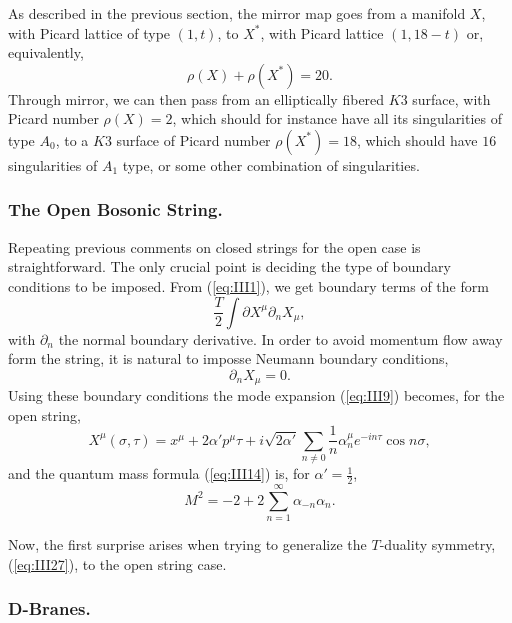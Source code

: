 As described in the previous section, the mirror map goes from a
manifold $X$, with Picard lattice of type $(1,t)$, to $X^*$, with
Picard lattice $(1,18-t)$ or, equivalently,
\begin{equation}
\rho(X) + \rho(X^*)= 20.
\end{equation}
Through mirror, we can then pass from an elliptically fibered $K3$
surface, with Picard number $\rho(X)=2$, which should for
instance have all its singularities of type $A_0$, to a $K3$
surface of Picard number $\rho(X^*)=18$, which should have $16$
singularities of $A_1$ type, or some other combination of
singularities.


\subsubsection{The Open Bosonic String.}

Repeating previous comments on closed strings for the open case is 
straightforward. The only crucial point is deciding the type of boundary 
conditions to be imposed. From (\ref{eq:III1}), we get boundary terms of 
the form
\begin{equation}
\frac {T}{2} \int \partial X^{\mu} \partial_n X_{\mu},
\label{eq:III31}
\end{equation}
with $\partial_n$ the normal boundary derivative. In order to avoid 
momentum flow away form the string, it is natural to imposse 
Neumann boundary conditions,
\begin{equation}
\partial_n X_{\mu} = 0.
\label{eq:III31b}
\end{equation}
Using these boundary conditions the mode expansion (\ref{eq:III9}) becomes, 
for the open string,
\begin{equation}
X^{\mu} (\sigma,\tau)=x^{\mu} + 2 \alpha' p^{\mu} \tau + i \sqrt{2 \alpha'} 
\sum_{n \neq 0} \frac {1}{n} \alpha_n^{\mu} e^{-i n \tau} \cos n \sigma,
\label{eq:III32}
\end{equation}
and the quantum mass formula (\ref{eq:III14}) is, for $\alpha'=\frac {1}{2}$,
\begin{equation}
M^2 = -2 +2 \sum_{n=1}^{\infty} \alpha_{-n} \alpha_n.
\label{eq:III33}
\end{equation}
  
Now, the first surprise arises when trying to generalize the $T$-duality 
symmetry, (\ref{eq:III27}), to the open string case.

\subsubsection{D-Branes.}

